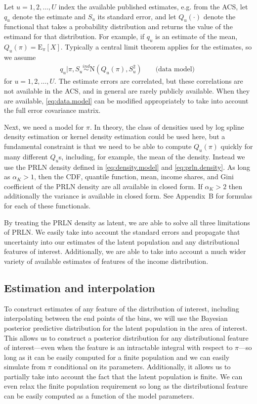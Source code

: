 \documentclass[12pt]{article}
\newcommand{\E}{\mathrm{E}}
\begin{document}
Let $u=1,2,\dots,U$ index the available published estimates, e.g. from the ACS, let $q_u$ denote the estimate and $S_u$ its standard error, and let $Q_u(\cdot)$ denote the functional that takes a probability distribution and returns the value of the estimand for that distribution. For example, if $q_u$ is an estimate of the mean, $Q_u(\pi) = \E_{\pi}[X]$. Typically a central limit theorem applies for the estimates, so we assume
\begin{align}
q_u|\pi, S_u \stackrel{ind}{\sim}\mathrm{N}(Q_u(\pi), S_u^2) && \mbox{ (data model) } \label{eq:data.model}
\end{align}
for $u=1,2,\dots,U$. The estimate errors are correlated, but these correlations are not available in the ACS, and in general are rarely publicly available. When they are available, \eqref{eq:data.model} can be modified appropriately to take into account the full error covariance matrix.

Next, we need a model for $\pi$. In theory, the class of densities used by log spline density estimation \citep{stone1994use} or kernel density estimation \citep{scott2015multivariate} could be used here, but a fundamental constraint is that we need to be able to compute $Q_u(\pi)$ quickly for many different $Q_u$s, including, for example, the mean of the density. Instead we use the PRLN density defined in \eqref{eq:density.model} and \eqref{eq:prln.density}. As long as $\alpha_K > 1$, then the CDF, quantile function, mean, income shares, and Gini coefficient of the PRLN density are all available in closed form. If $\alpha_K > 2$ then additionally the variance is available in closed form. See Appendix~B %
 for formulas for each of these functionals.

By treating the PRLN density as latent, we are able to solve all three limitations of PRLN. We easily take into account the standard errors and propagate that uncertainty into our estimates of the latent population and any distributional features of interest. Additionally, we are able to take into account a much wider variety of available estimates of features of the income distribution.

\subsection{Estimation and interpolation}\label{sec:post.pred}
To construct estimates of any feature of the distribution of interest, including interpolating between the end points of the bins, we will use the Bayesian posterior predictive distribution for the latent population in the area of interest. This allows us to construct a posterior distribution for any distributional feature of interest---even when the feature is an intractable integral with respect to $\pi$---so long as it can be easily computed for a finite population and we can easily simulate from $\pi$ conditional on its parameters. Additionally, it allows us to partially take into account the fact that the latent population is finite. We can even relax the finite population requirement so long as the distributional feature can be easily computed as a function of the model parameters.
\end{document}
